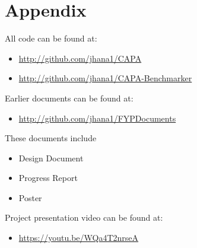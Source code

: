 \section{Appendix}
All code can be found at:
\begin{itemize}
    \item\url{http://github.com/jhana1/CAPA}
    \item\url{http://github.com/jhana1/CAPA-Benchmarker}
\end{itemize}
Earlier documents can be found at:
\begin{itemize}
    \item\url{http://github.com/jhana1/FYPDocuments}
\end{itemize}
These documents include
\begin{itemize}
    \item Design Document
    \item Progress Report
    \item Poster
\end{itemize}
Project presentation video can be found at:
\begin{itemize}
    \item\url{https://youtu.be/WQa4T2nrseA}
\end{itemize}



